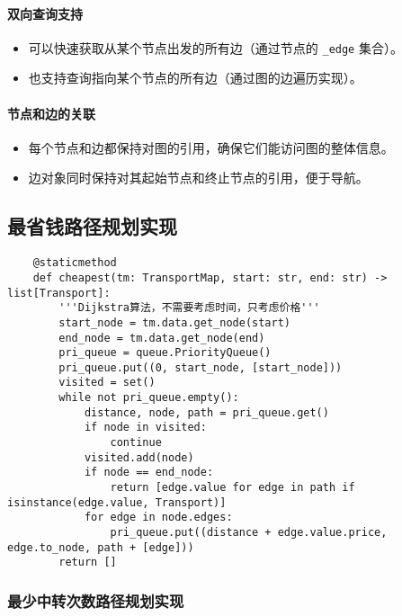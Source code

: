 \documentclass[10pt]{article}
\begin{document}
    \paragraph{双向查询支持}
    \begin{itemize}[label=\textbullet]
        \item 可以快速获取从某个节点出发的所有边（通过节点的 \texttt{\_edge} 集合）。
        \item 也支持查询指向某个节点的所有边（通过图的边遍历实现）。
    \end{itemize}

    \paragraph{节点和边的关联}
    \begin{itemize}[label=\textbullet]
        \item 每个节点和边都保持对图的引用，确保它们能访问图的整体信息。
        \item 边对象同时保持对其起始节点和终止节点的引用，便于导航。
    \end{itemize}

    \subsection{最省钱路径规划实现}
    \begin{lstlisting}
    @staticmethod
    def cheapest(tm: TransportMap, start: str, end: str) -> list[Transport]:
        '''Dijkstra算法，不需要考虑时间，只考虑价格'''
        start_node = tm.data.get_node(start)
        end_node = tm.data.get_node(end)
        pri_queue = queue.PriorityQueue()
        pri_queue.put((0, start_node, [start_node]))
        visited = set()
        while not pri_queue.empty():
            distance, node, path = pri_queue.get()
            if node in visited:
                continue
            visited.add(node)
            if node == end_node:
                return [edge.value for edge in path if isinstance(edge.value, Transport)]
            for edge in node.edges:
                pri_queue.put((distance + edge.value.price, edge.to_node, path + [edge]))
        return []
    \end{lstlisting}

    \subsubsection{最少中转次数路径规划实现}
\end{document}

